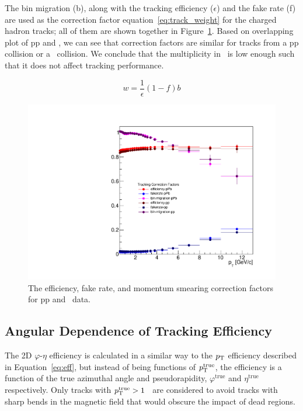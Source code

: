 The bin migration (b), along with the tracking efficiency ($\epsilon$) and the fake rate (f) are used as the correction factor equation~\ref{eq:track_weight} for the charged hadron tracks; all of them are shown together in Figure~\ref{fig:correctionFactors}. Based on overlapping plot of pp and \pPb, we can see that correction factors are similar for tracks from a pp collision or a \pPb~collision. We conclude that the multiplicity in \pPb~is low enough such that it does not affect tracking performance.  

\begin{equation}\label{eq:track_weight}
w = \frac{1}{\epsilon}(1-f)b
\end{equation}

\begin{figure}[h]
\center
\includegraphics[width=.7\textwidth]{Data_Analysis/Tracking/trackCorrectionFactors_pPbAndpp.pdf}
\caption{The efficiency, fake rate, and momentum smearing correction factors for pp and \pPb~data.}
\label{fig:correctionFactors}
\end{figure}

\FloatBarrier

\subsection{Angular Dependence of Tracking Efficiency}
The 2D $\varphi$-$\eta$ efficiency is calculated in a similar way to the $p_{\mathrm{T}}$ efficiency described in Equation~\ref{eq:eff}, but instead of being functions of $p_{\mathrm{T}}^{\mathrm{true}}$, the efficiency is a function of the true azimuthal angle and pseudorapidity, $\varphi^{\mathrm{true}}$ and $\eta^{\mathrm{true}}$ respectively. Only tracks with {$p_{\mathrm{T}}^{\mathrm{true}}>1$} \GeVc~are considered to avoid tracks with sharp bends in the magnetic field that would obscure the impact of dead regions.

